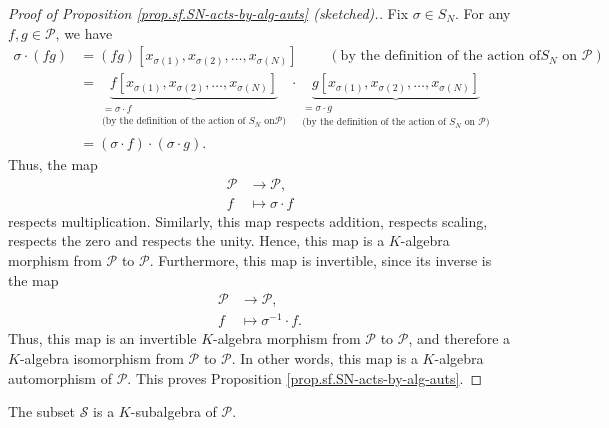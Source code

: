 \begin{fineprint}
\begin{proof}
[Proof of Proposition \ref{prop.sf.SN-acts-by-alg-auts} (sketched).]Fix
$\sigma\in S_{N}$. For any $f,g\in\mathcal{P}$, we have%
\begin{align}
\sigma\cdot\left(  fg\right)   &  =\left(  fg\right)  \left[  x_{\sigma\left(
1\right)  },x_{\sigma\left(  2\right)  },\ldots,x_{\sigma\left(  N\right)
}\right]  \ \ \ \ \ \ \ \ \ \ \left(  \text{by the definition of the action of
}S_{N}\text{ on }\mathcal{P}\right) \nonumber\\
&  =\underbrace{f\left[  x_{\sigma\left(  1\right)  },x_{\sigma\left(
2\right)  },\ldots,x_{\sigma\left(  N\right)  }\right]  }_{\substack{=\sigma
\cdot f\\\text{(by the definition of the action of }S_{N}\text{ on
}\mathcal{P}\text{)}}}\cdot\underbrace{g\left[  x_{\sigma\left(  1\right)
},x_{\sigma\left(  2\right)  },\ldots,x_{\sigma\left(  N\right)  }\right]
}_{\substack{=\sigma\cdot g\\\text{(by the definition of the action of }%
S_{N}\text{ on }\mathcal{P}\text{)}}}\nonumber\\
&  =\left(  \sigma\cdot f\right)  \cdot\left(  \sigma\cdot g\right)  .
\label{pf.prop.sf.SN-acts-by-alg-auts.1}%
\end{align}
Thus, the map%
\begin{align*}
\mathcal{P}  &  \rightarrow\mathcal{P},\\
f  &  \mapsto\sigma\cdot f
\end{align*}
respects multiplication. Similarly, this map respects addition, respects
scaling, respects the zero and respects the unity. Hence, this map is a
$K$-algebra morphism from $\mathcal{P}$ to $\mathcal{P}$. Furthermore, this
map is invertible, since its inverse is the map%
\begin{align*}
\mathcal{P}  &  \rightarrow\mathcal{P},\\
f  &  \mapsto\sigma^{-1}\cdot f.
\end{align*}
Thus, this map is an invertible $K$-algebra morphism from $\mathcal{P}$ to
$\mathcal{P}$, and therefore a $K$-algebra isomorphism from $\mathcal{P}$ to
$\mathcal{P}$. In other words, this map is a $K$-algebra automorphism of
$\mathcal{P}$. This proves Proposition \ref{prop.sf.SN-acts-by-alg-auts}.
\end{proof}
\end{fineprint}

\begin{theorem}
\label{thm.sf.S-subalg}The subset $\mathcal{S}$ is a $K$-subalgebra of
$\mathcal{P}$.
\end{theorem}

